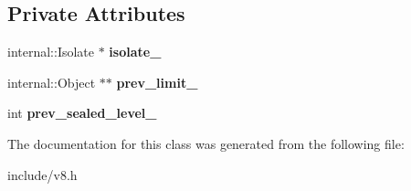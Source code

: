 \subsection*{Private Attributes}
\begin{DoxyCompactItemize}
\item 
internal\+::\+Isolate $\ast$ {\bfseries isolate\+\_\+}\hypertarget{classv8_1_1_seal_handle_scope_a11eec9b548caf6a6e6b1ff124438da5f}{}\label{classv8_1_1_seal_handle_scope_a11eec9b548caf6a6e6b1ff124438da5f}

\item 
internal\+::\+Object $\ast$$\ast$ {\bfseries prev\+\_\+limit\+\_\+}\hypertarget{classv8_1_1_seal_handle_scope_a961f11f0c68251029b03a55a3724484a}{}\label{classv8_1_1_seal_handle_scope_a961f11f0c68251029b03a55a3724484a}

\item 
int {\bfseries prev\+\_\+sealed\+\_\+level\+\_\+}\hypertarget{classv8_1_1_seal_handle_scope_a070f75eb0735b4b0bf7b29d69e6b4e21}{}\label{classv8_1_1_seal_handle_scope_a070f75eb0735b4b0bf7b29d69e6b4e21}

\end{DoxyCompactItemize}


The documentation for this class was generated from the following file\+:\begin{DoxyCompactItemize}
\item 
include/v8.\+h\end{DoxyCompactItemize}
